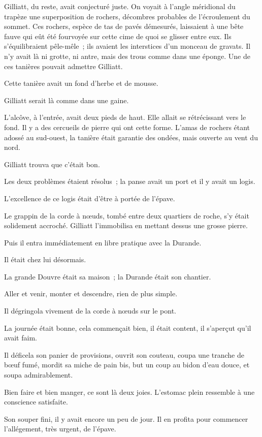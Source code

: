 \documentclass[french,twoside]{book} %
\begin{document}
Gilliatt, du reste, avait conjecturé juste. On voyait à l’angle méridional du trapèze une superposition de rochers, décombres probables de l’écroulement du sommet. Ces rochers, espèce de tas de pavés démesurés, laissaient à une bête fauve qui eût été fourvoyée sur cette cime de quoi se glisser entre eux. Ils s’équilibraient pêle-mêle ; ils avaient les interstices d’un monceau de gravats. Il n’y avait là ni grotte, ni antre, mais des trous comme dans une éponge. Une de ces tanières pouvait admettre Gilliatt.\par
Cette tanière avait un fond d’herbe et de mousse.\par
Gilliatt serait là comme dans une gaine.\par
L’alcôve, à l’entrée, avait deux pieds de haut. Elle allait se rétrécissant vers le fond. Il y a des cercueils de pierre qui ont cette forme. L’amas de rochers étant adossé au sud-ouest, la tanière était garantie des ondées, mais ouverte au vent du nord.\par
Gilliatt trouva que c’était bon.\par
Les deux problèmes étaient résolus ; la panse avait un port et il y avait un logis.\par
 L’excellence de ce logis était d’être à portée de l’épave.\par
Le grappin de la corde à nœuds, tombé entre deux quartiers de roche, s’y était solidement accroché. Gilliatt l’immobilisa en mettant dessus une grosse pierre.\par
Puis il entra immédiatement en libre pratique avec la Durande.\par
Il était chez lui désormais.\par
La grande Douvre était sa maison ; la Durande était son chantier.\par
Aller et venir, monter et descendre, rien de plus simple.\par
Il dégringola vivement de la corde à nœuds sur le pont.\par
La journée était bonne, cela commençait bien, il était content, il s’aperçut qu’il avait faim.\par
Il déficela son panier de provisions, ouvrit son couteau, coupa une tranche de bœuf fumé, mordit sa miche de pain bis, but un coup au bidon d’eau douce, et soupa admirablement.\par
Bien faire et bien manger, ce sont là deux joies. L’estomac plein ressemble à une conscience satisfaite.\par
Son souper fini, il y avait encore un peu de jour. Il en profita pour commencer l’allégement, très urgent, de l’épave.\par
\end{document}
